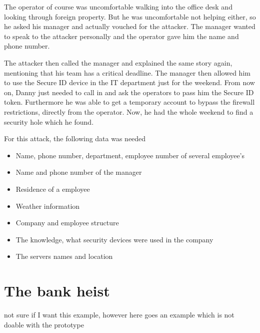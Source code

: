 The operator of course was uncomfortable walking into the office desk and
looking through foreign property. But he was uncomfortable not helping either,
so he asked his manager and actually vouched for the attacker. The manager
wanted to speak to the attacker personally and the operator gave him the name
and phone number.

The attacker then called the manager and explained the same story again,
mentioning that his team has a critical deadline. The manager then allowed him
to use the Secure ID device in the IT department just for the weekend. From now
on, Danny just needed to call in and ask the operators to pass him the Secure
ID token. Furthermore he was able to get a temporary account to bypass the
firewall restrictions, directly from the operator. Now, he had the whole
weekend to find a security hole which he found.

For this attack, the following data was needed

\begin{itemize}
  \item Name, phone number, department, employee number of several employee's
  \item Name and phone number of the manager
  \item Residence of a employee
  \item Weather information
  \item Company and employee structure
  \item The knowledge, what security devices were used in the company
  \item The servers names and location
\end{itemize}


\section{The bank heist}

not sure if I want this example, however here goes an example which is not
doable with the prototype

